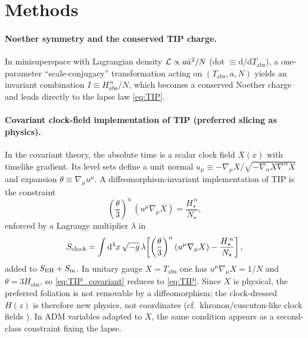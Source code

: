 \documentclass[12pt]{article}
\newcommand{\Tabs}{T_{\mathrm{abs}}}
\newcommand{\Hobs}{H_{\mathrm{obs}}}
\newcommand{\dd}{\mathrm{d}}
\begin{document}
\section*{Methods}

\paragraph{Noether symmetry and the conserved TIP charge.}
In minisuperspace with Lagrangian density ${\cal L}\propto a\dot a^{2}/N$ (dot $\equiv \dd/\dd\Tabs$), a one-parameter ``scale-conjugacy'' transformation acting on $(\Tabs,a,N)$ yields an invariant combination $I\equiv \Hobs^{\,n}/N$, which becomes a conserved Noether charge \citep{Noether1918} and leads directly to the lapse law \eqref{eq:TIP}.

\paragraph{Covariant clock-field implementation of TIP (preferred slicing as physics).}
In the covariant theory, the absolute time is a scalar clock field $X(x)$ with timelike gradient. Its level sets define a unit normal $u_{\mu}\equiv -\nabla_{\mu}X/\sqrt{-\nabla_{\alpha}X\nabla^{\alpha}X}$ and expansion $\theta\equiv \nabla_{\mu}u^{\mu}$. A diffeomorphism-invariant implementation of TIP is the constraint
\begin{equation}
\left(\frac{\theta}{3}\right)^{n}\,(u^{\mu}\nabla_{\mu}X)=\frac{H_{\star}^{\,n}}{N_{\star}},
\label{eq:TIP_covariant}
\end{equation}
enforced by a Lagrange multiplier $\lambda$ in
\begin{equation}
S_{\rm clock}=\int \dd^{4}x\,\sqrt{-g}\,\lambda\!\left[\left(\frac{\theta}{3}\right)^{n}(u^{\mu}\nabla_{\mu}X)-\frac{H_{\star}^{\,n}}{N_{\star}}\right],
\end{equation}
added to $S_{\rm EH}+S_{\rm m}$. In unitary gauge $X=\Tabs$ one has $u^{\mu}\nabla_{\mu}X=1/N$ and $\theta=3\Hobs$, so \eqref{eq:TIP_covariant} reduces to \eqref{eq:TIP}. Since $X$ is physical, the preferred foliation is not removable by a diffeomorphism; the clock-dressed $H(z)$ is therefore new physics, not coordinates (cf.\ khronon/cuscuton-like clock fields \citep{JacobsonMattingly2001,Afshordi2007}). In ADM variables adapted to $X$, the same condition appears as a second-class constraint fixing the lapse.
\end{document}
